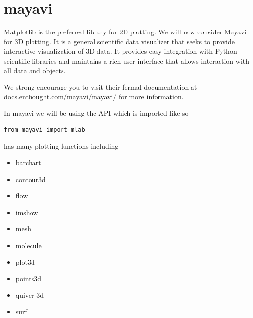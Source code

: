 \section*{mayavi}

Matplotlib is the preferred library for 2D plotting. We will now
consider Mayavi for 3D plotting. It is a general scientific data
visualizer that seeks to provide interactive visualization of 3D data.
It provides easy integration with Python scientific libraries and
maintains a rich user interface that allows interaction with all data
and objects.

We strong encourage you to visit their formal documentation at
\url{docs.enthought.com/mayavi/mayavi/} for more information. 

In mayavi we will be using the  API which is imported like so
\begin{lstlisting}
from mayavi import mlab
\end{lstlisting}

 has many plotting functions including
\begin{itemize}
\item barchart
\item contour3d
\item flow
\item imshow
\item mesh
\item molecule
\item plot3d
\item points3d
\item quiver 3d
\item surf
\end{itemize}

